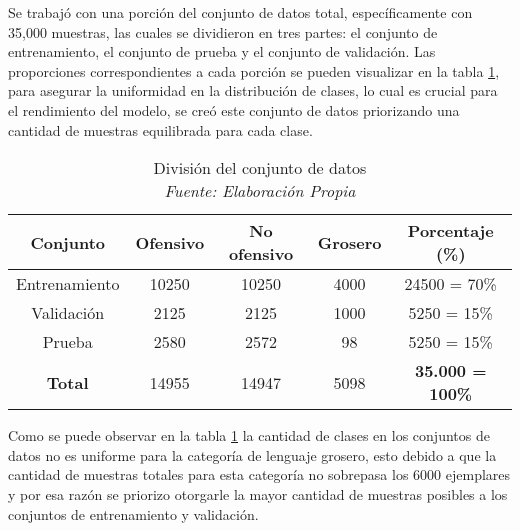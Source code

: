 Se trabajó con una porción del conjunto de datos total, específicamente con 35,000 muestras, las cuales se dividieron en tres partes: el conjunto de entrenamiento, el conjunto de prueba y el conjunto de validación. Las proporciones correspondientes a cada porción se pueden visualizar en la tabla \ref{tbl:conjuntos}, para asegurar la uniformidad en la distribución de clases, lo cual es crucial para el rendimiento del modelo, se creó este conjunto de datos priorizando una cantidad de muestras equilibrada para cada clase.


\begin{table}[!ht]
	\centering
	\begin{tabular}{|c|c|c|c|c|}
		\hline
		\textbf{Conjunto} & \textbf{Ofensivo} & \textbf{No ofensivo} & \textbf{Grosero} & \textbf{Porcentaje (\%)} \\ \hline
		Entrenamiento & 10250 & 10250 & 4000 & 24500 = 70\% \\ 
		Validación & 2125 & 2125 & 1000 & 5250 = 15\% \\ 
		Prueba & 2580 & 2572 & 98 & 5250 = 15\% \\ \hline
		\textbf{Total} & 14955 & 14947 & 5098 & \textbf{35.000 = 100\%} \\ \hline
	\end{tabular}
	\caption{División del conjunto de datos
		\\\textit{Fuente: Elaboración Propia}}
	\label{tbl:conjuntos}
\end{table}


Como se puede observar en la tabla \ref{tbl:conjuntos} la cantidad de clases en los conjuntos de datos no es uniforme para la categoría de lenguaje grosero, esto debido a que la cantidad de muestras totales para esta categoría no sobrepasa los 6000 ejemplares y por esa razón se priorizo otorgarle la mayor cantidad de muestras posibles a los conjuntos de entrenamiento y validación.
